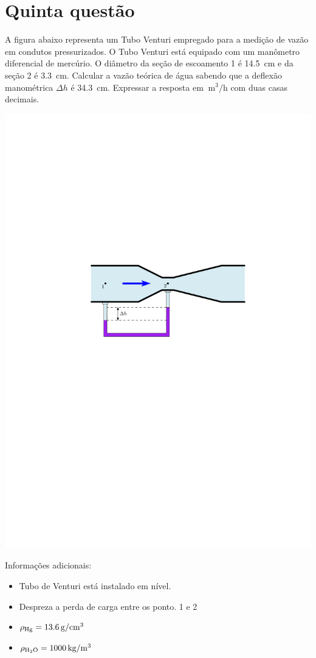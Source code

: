 \documentclass[a4paper, 12pt, brazilian]{article}
\begin{document}
	\section{Quinta questão}
	A figura abaixo representa um Tubo Venturi empregado para a medição de vazão em condutos pressurizados. O Tubo Venturi está equipado com um manômetro diferencial de mercúrio. O diâmetro da seção de escoamento 1 é \SI{14.5}{\centi\meter} e da seção 2 é \SI{3.3}{\centi\meter}. Calcular a vazão teórica de água sabendo que a deflexão manométrica $\Delta h$ é \SI{34.3}{\centi\meter}. Expressar a resposta em $\SI{}{\meter^{3}/\hour}$ com duas casas decimais.
	\begin{center}
		\includegraphics[width=.9\linewidth]{assets/images/ex5}
	\end{center}
	\noindent Informações adicionais:
	\begin{itemize}
		\item Tubo de Venturi está instalado em nível.
		\item Despreza a perda de carga entre os ponto. 1 e 2 
		\item $\rho_{\ce{Hg}}=\SI{13.6}{\gram/\centi\meter^{3}}$
		\item $\rho_{\ce{H2O}}=\SI{1000}{\kilogram/\meter^{3}}$
	\end{itemize}
\end{document}
